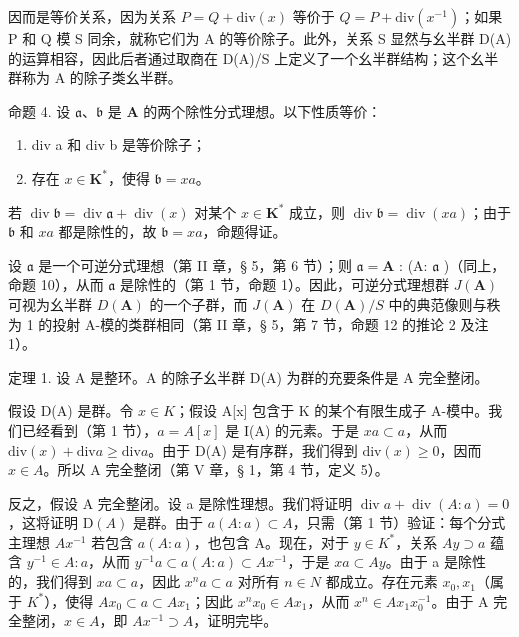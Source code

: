 因而是等价关系，因为关系 \(P = Q + \text{div}(x)\) 等价于 \(Q = P + \text{div}(x^{-1})\)；如果 P 和 Q 模 S 同余，就称它们为 A 的等价除子。此外，关系 S 显然与幺半群 D(A) 的运算相容，因此后者通过取商在 D(A)/S 上定义了一个幺半群结构；这个幺半群称为 A 的除子类幺半群。

命题 4. 设 \(\mathfrak{a}\)、\(\mathfrak{b}\) 是 \(\mathbf{A}\) 的两个除性分式理想。以下性质等价：

\begin{enumerate}
\def\labelenumi{(\alph{enumi})}
\item
  div a 和 div b 是等价除子；
\item
  存在 \(x \in \mathbf{K}^*\)，使得 \(\mathfrak{b} = xa\)。
\end{enumerate}

若 \(\operatorname{div} \mathfrak{b} = \operatorname{div} \mathfrak{a} + \operatorname{div}(x)\) 对某个 \(x \in \mathbf{K}^*\) 成立，则 \(\operatorname{div} \mathfrak{b} = \operatorname{div}(xa)\)；由于 \(\mathfrak{b}\) 和 \(xa\) 都是除性的，故 \(\mathfrak{b} = xa\)，命题得证。

设 \(\mathfrak{a}\) 是一个可逆分式理想（第 II 章，§ 5，第 6 节）；则 \(\mathfrak{a} = \mathbf{A}\) : (A: \(\mathfrak{a}\) )（同上，命题 10），从而 \(\mathfrak{a}\) 是除性的（第 1 节，命题 1）。因此，可逆分式理想群 \(J(\mathbf{A})\) 可视为幺半群 \(D(\mathbf{A})\) 的一个子群，而 \(J(\mathbf{A})\) 在 \(D(\mathbf{A}) / S\) 中的典范像则与秩为 1 的投射 A-模的类群相同（第 II 章，§ 5，第 7 节，命题 12 的推论 2 及注 1）。

定理 1. 设 A 是整环。A 的除子幺半群 D(A) 为群的充要条件是 A 完全整闭。

假设 D(A) 是群。令 \(x \in K\)；假设 A{[}x{]} 包含于 K 的某个有限生成子 A-模中。我们已经看到（第 1 节），\(a = A[x]\) 是 I(A) 的元素。于是 \(xa \subset a\)，从而 \(\text{div}(x) + \text{div}a \geqslant \text{div}a\)。由于 D(A) 是有序群，我们得到 \(\text{div}(x) \geqslant 0\)，因而 \(x \in A\)。所以 A 完全整闭（第 V 章，§ 1，第 4 节，定义 5）。

反之，假设 A 完全整闭。设 a 是除性理想。我们将证明 \(\operatorname{div} a + \operatorname{div}(A: a) = 0\)，这将证明 \(\mathrm{D}(A)\) 是群。由于 \(a(A: a) \subset A\)，只需（第 1 节）验证：每个分式主理想 \(Ax^{-1}\) 若包含 \(a(A: a)\)，也包含 A。现在，对于 \(y \in K^{*}\)，关系 \(Ay \supset a\) 蕴含 \(y^{-1} \in A: a\)，从而 \(y^{-1}a \subset a(A: a) \subset Ax^{-1}\)，于是 \(xa \subset Ay\)。由于 a 是除性的，我们得到 \(xa \subset a\)，因此 \(x^{n}a \subset a\) 对所有 \(n \in N\) 都成立。存在元素 \(x_{0}, x_{1}\)（属于 \(K^{*}\)），使得 \(Ax_{0} \subset a \subset Ax_{1}\)；因此 \(x^{n}x_{0} \in Ax_{1}\)，从而 \(x^{n} \in Ax_{1}x_{0}^{-1}\)。由于 A 完全整闭，\(x \in A\)，即 \(Ax^{-1} \supset A\)，证明完毕。

